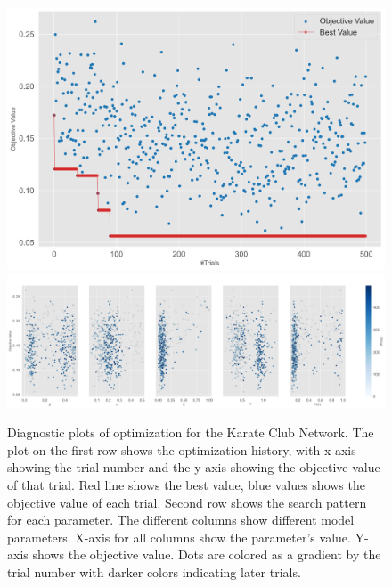\documentclass[11pt]{article}
\begin{document}
\begin{figure}[H]
    \centering
    \includegraphics[width=.7\linewidth]{../plots/overall/Optimization_History_karate.png}
    \includegraphics[width=.7\linewidth]{../plots/overall/Plot_Slice_karate.png}
  \caption{Diagnostic plots of optimization for the Karate Club Network. The plot on the first row shows the optimization history, with x-axis showing the trial number and the y-axis showing the objective value of that trial. Red line shows the best value, blue values shows the objective value of each trial. Second row shows the search pattern for each parameter. The different columns show different model parameters. X-axis for all columns show the parameter's value. Y-axis shows the objective value. Dots are colored as a gradient by the trial number with darker colors indicating later trials.}
  \label{appendix:optimization_karate}
\end{figure}
\end{document}
